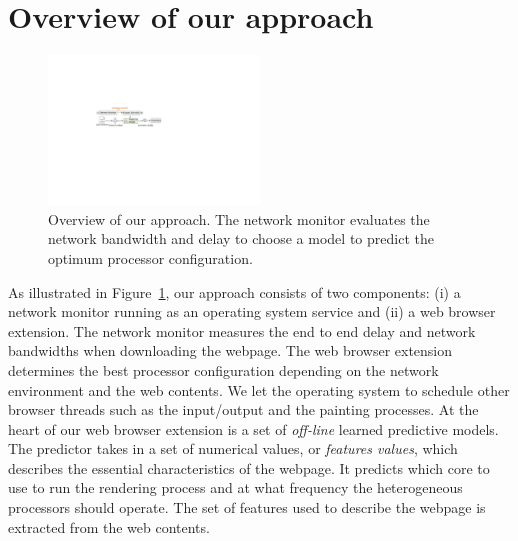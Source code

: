 \section{Overview of our approach}

\begin{figure}
\begin{center}
\includegraphics[width=0.5\textwidth]{figure/predictor.pdf}
\end{center}
\caption{Overview of our approach. The network monitor evaluates the network bandwidth and delay to choose a model to predict the
optimum processor configuration. }
\vspace{-4mm}
\label{fig:predictor}
\end{figure}





As illustrated in Figure~\ref{fig:predictor}, our approach consists of two components: (i) a network monitor running as an operating system
service and (ii) a web browser extension. The network monitor measures the end to end
delay and network bandwidths when downloading the
webpage. The web browser extension determines the best processor configuration depending on the network environment and the web contents.
We let the operating system to schedule other browser threads such as the input/output and the painting processes.
At the heart of our web browser extension is a set of \emph{off-line} learned predictive models. 
The predictor takes in a set of numerical values, or \emph{features values},
which describes the essential characteristics of the webpage. It predicts which core to use to run the rendering process and at what
frequency the heterogeneous processors should operate. The set of features used to describe the webpage is extracted from the web contents.




